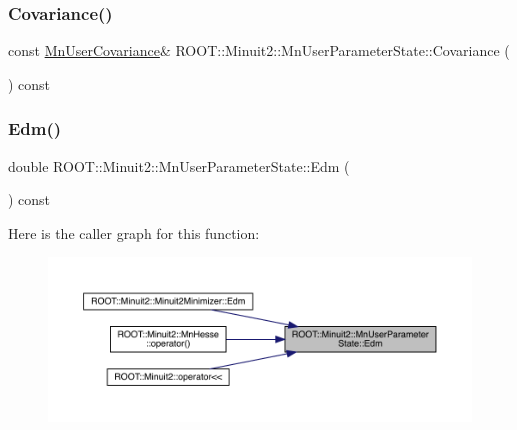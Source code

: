 \subsubsection{\texorpdfstring{Covariance()}{Covariance()}\hspace{0.1cm}{\footnotesize\ttfamily [2/2]}}
{\footnotesize\ttfamily const \mbox{\hyperlink{classROOT_1_1Minuit2_1_1MnUserCovariance}{Mn\+User\+Covariance}}\& R\+O\+O\+T\+::\+Minuit2\+::\+Mn\+User\+Parameter\+State\+::\+Covariance (\begin{DoxyParamCaption}{ }\end{DoxyParamCaption}) const\hspace{0.3cm}{\ttfamily [inline]}}

\mbox{\label{classROOT_1_1Minuit2_1_1MnUserParameterState_a4bf3ac21744e5ffe2d58eec66885f958}} 
\subsubsection{\texorpdfstring{Edm()}{Edm()}\hspace{0.1cm}{\footnotesize\ttfamily [1/2]}}
{\footnotesize\ttfamily double R\+O\+O\+T\+::\+Minuit2\+::\+Mn\+User\+Parameter\+State\+::\+Edm (\begin{DoxyParamCaption}{ }\end{DoxyParamCaption}) const\hspace{0.3cm}{\ttfamily [inline]}}

Here is the caller graph for this function\+:\nopagebreak
\begin{figure}[H]
\begin{center}
\leavevmode
\includegraphics[width=350pt]{d3/de0/classROOT_1_1Minuit2_1_1MnUserParameterState_a4bf3ac21744e5ffe2d58eec66885f958_icgraph}
\end{center}
\end{figure}
\mbox{\label{classROOT_1_1Minuit2_1_1MnUserParameterState_a4bf3ac21744e5ffe2d58eec66885f958}} 
